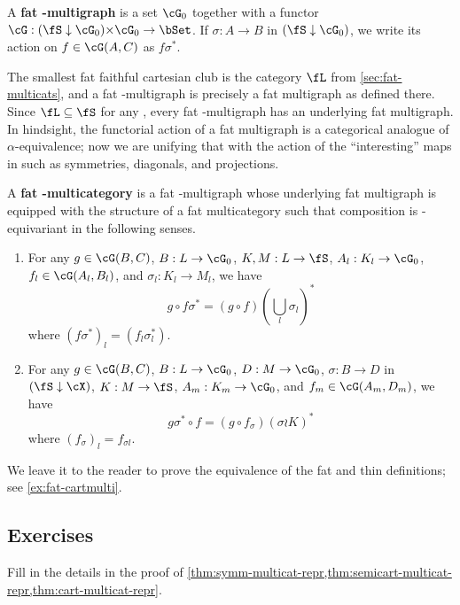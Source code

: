 \documentclass{book}
\begin{document}
\begin{defn}
  A \textbf{fat \fS-multigraph} is a set $\cG_0$ together with a functor $\cG:(\fS\dn\cG_0) \times \cG_0 \to \bSet$.
  If $\sigma:A\to B$ in $(\fS\dn\cG_0)$, we write its action on $f\in \cG(A,C)$ as $f\sigma^*$.
\end{defn}

The smallest fat faithful cartesian club is the category $\fL$ from \cref{sec:fat-multicats}, and a fat \fL-multigraph is precisely a fat multigraph as defined there.
Since $\fL\subseteq \fS$ for any \fS, every fat \fS-multigraph has an underlying fat multigraph.
In hindsight, the functorial action of a fat multigraph is a categorical analogue of $\alpha$-equivalence; now we are unifying that with the action of the ``interesting'' maps in \fS such as symmetries, diagonals, and projections.

\begin{defn}
  A \textbf{fat \fS-multicategory} is a fat \fS-multigraph whose underlying fat multigraph is equipped with the structure of a fat multicategory such that composition is \fS-equivariant in the following senses.
  \begin{enumerate}
  \item For any $g\in\cG(B,C)$, $B:L\to\cG_0$, $K,M:L\to \fS$, $A_l:K_l\to \cG_0$, $f_l \in \cG(A_l,B_l)$, and $\sigma_l : K_l \to M_l$, we have
    \[g\circ f\sigma^* = (g\circ f)\left(\textstyle\bigcup_l \sigma_l\right)^*\]
    where $(f\sigma^*)_l = (f_l \sigma_l^*)$.
  \item For any $g\in\cG(B,C)$, $B:L\to\cG_0$, $D:M\to \cG_0$, $\sigma:B\to D$ in $(\fS\dn \cX)$, $K:M\to \fS$, $A_m:K_m\to \cG_0$, and $f_m \in \cG(A_{m},D_{m})$, we have
    \[g\sigma^* \circ f = (g\circ f_\sigma)(\sigma \wr K)^*\]
    where $(f_\sigma)_l = f_{\sigma l}$.
  \end{enumerate}
\end{defn}

We leave it to the reader to prove the equivalence of the fat and thin definitions; see \cref{ex:fat-cartmulti}.


\subsection*{Exercises}

\begin{ex}\label{ex:gen-multicat-repr}
  Fill in the details in the proof of \cref{thm:symm-multicat-repr,thm:semicart-multicat-repr,thm:cart-multicat-repr}.
\end{ex}
\end{document}
